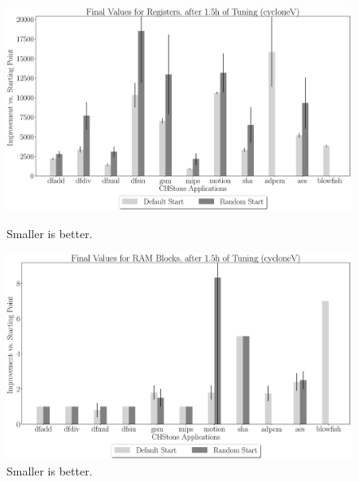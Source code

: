 \documentclass[12pt, a4paper]{article}
\begin{document}
\begin{figure}[htpb]
    \centering
    \begin{minipage}{.48\textwidth}
        \centering
        \includegraphics[width=.8\textwidth]{abs_comp_regs_5400_chstone_cycloneV}
        \caption{Smaller is better.}
    \end{minipage}%
    \begin{minipage}{.48\textwidth}
        \centering
        \includegraphics[width=.8\textwidth]{abs_comp_ram_5400_chstone_cycloneV}
        \caption{Smaller is better.}
    \end{minipage}%


\end{figure}
\end{document}
